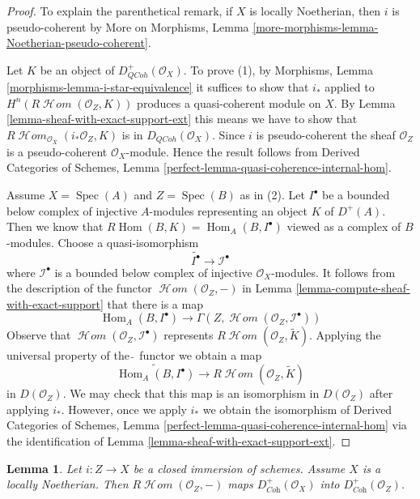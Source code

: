 \documentclass{stacks-project}
\theoremstyle{plain}
\newtheorem{lemma}[subsection]{Lemma}
\theoremstyle{definition}
\theoremstyle{remark}
\numberwithin{equation}{subsection}
\def\Spec{\mathop{\mathrm{Spec}}}
\def\Hom{\mathop{\mathrm{Hom}}\nolimits}
\def\SheafHom{\mathop{\mathcal{H}\!\mathit{om}}\nolimits}
\def\QCoh{\mathit{QCoh}}
\begin{document}
\begin{proof}
To explain the parenthetical remark, if $X$ is locally Noetherian, then
$i$ is pseudo-coherent by
More on Morphisms, Lemma \ref{more-morphisms-lemma-Noetherian-pseudo-coherent}.

\medskip\noindent
Let $K$ be an object of $D^+_\QCoh(\mathcal{O}_X)$. To prove (1), by
Morphisms, Lemma \ref{morphisms-lemma-i-star-equivalence}
it suffices to show that $i_*$ applied to
$H^n(R\SheafHom(\mathcal{O}_Z, K))$ produces a
quasi-coherent module on $X$. By
Lemma \ref{lemma-sheaf-with-exact-support-ext}
this means we have to show that
$R\SheafHom_{\mathcal{O}_X}(i_*\mathcal{O}_Z, K)$
is in $D_\QCoh(\mathcal{O}_X)$. Since $i$ is pseudo-coherent
the sheaf $\mathcal{O}_Z$ is a pseudo-coherent $\mathcal{O}_X$-module.
Hence the result follows from
Derived Categories of Schemes, Lemma
\ref{perfect-lemma-quasi-coherence-internal-hom}.

\medskip\noindent
Assume $X = \Spec(A)$ and $Z = \Spec(B)$ as in (2).
Let $I^\bullet$ be a bounded below complex of injective $A$-modules
representing an object $K$ of $D^+(A)$.
Then we know that $R\Hom(B, K) = \Hom_A(B, I^\bullet)$ viewed
as a complex of $B$-modules. Choose a quasi-isomorphism
$$
\widetilde{I^\bullet} \longrightarrow \mathcal{I}^\bullet
$$
where $\mathcal{I}^\bullet$ is a bounded below complex of injective
$\mathcal{O}_X$-modules. It follows from the description of
the functor $\SheafHom(\mathcal{O}_Z, -)$ in
Lemma \ref{lemma-compute-sheaf-with-exact-support}
that there is a map
$$
\Hom_A(B, I^\bullet)
\longrightarrow
\Gamma(Z, \SheafHom(\mathcal{O}_Z, \mathcal{I}^\bullet))
$$
Observe that $\SheafHom(\mathcal{O}_Z, \mathcal{I}^\bullet)$
represents $R\SheafHom(\mathcal{O}_Z, \widetilde{K})$.
Applying the universal property of the $\widetilde{\ }$ functor we
obtain a map
$$
\widetilde{\Hom_A(B, I^\bullet)}
\longrightarrow
R\SheafHom(\mathcal{O}_Z, \widetilde{K})
$$
in $D(\mathcal{O}_Z)$. We may check that this map is an isomorphism in
$D(\mathcal{O}_Z)$ after applying $i_*$. However, once we apply
$i_*$ we obtain the isomorphism of Derived Categories of Schemes,
Lemma \ref{perfect-lemma-quasi-coherence-internal-hom}
via the identification of
Lemma \ref{lemma-sheaf-with-exact-support-ext}.
\end{proof}

\begin{lemma}
\label{lemma-sheaf-with-exact-support-coherent}
Let $i : Z \to X$ be a closed immersion of schemes.
Assume $X$ is a locally Noetherian.
Then $R\SheafHom(\mathcal{O}_Z, -)$ maps $D^+_{\textit{Coh}}(\mathcal{O}_X)$
into $D^+_{\textit{Coh}}(\mathcal{O}_Z)$.
\end{lemma}
\end{document}
